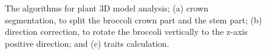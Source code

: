 \begin{figure}[htbp!]
  \begin{center}
  \end{center}
  \caption[The algorithms for plant 3D model analysis]{
    The algorithms for plant 3D model analysis; (a) crown segmentation, to split the broccoli crown part and the stem part; (b) direction correction, to rotate the broccoli vertically to the z-axis positive direction; and (c) traits calculation.
  }
  \label{fig:des_seg_alg}
\end{figure}